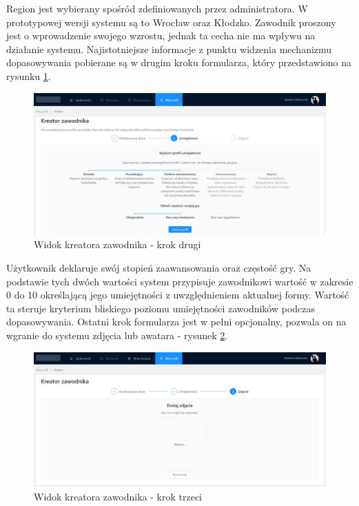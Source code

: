 Region jest wybierany spośród zdefiniowanych przez administratora. W prototypowej wersji systemu są to Wrocław oraz Kłodzko. Zawodnik proszony jest o wprowadzenie swojego wzrostu, jednak ta cecha nie ma wpływu na działanie systemu. Najistotniejsze informacje z punktu widzenia mechanizmu dopasowywania pobierane są w drugim kroku formularza, który przedstawiono na rysunku \ref{fig:ss-profile-2}.

\begin{figure}[H]
\centering
\includegraphics[width=\linewidth]{065-dzialanie/rys/ss-profile-2.PNG}
\caption{Widok kreatora zawodnika - krok drugi}
\label{fig:ss-profile-2}
\end{figure}

Użytkownik deklaruje swój stopień zaawansowania oraz częstość gry. Na podstawie tych dwóch wartości system przypisuje zawodnikowi wartość w zakresie 0 do 10 określającą jego umiejętności z uwzględnieniem aktualnej formy. Wartość ta steruje kryterium bliskiego poziomu umiejętności zawodników podczas dopasowywania. Ostatni krok formularza jest w pełni opcjonalny, pozwala on na wgranie do systemu zdjęcia lub awatara - rysunek \ref{fig:ss-profile-3}.

\begin{figure}[H]
\centering
\includegraphics[width=\linewidth]{065-dzialanie/rys/ss-profile-3.PNG}
\caption{Widok kreatora zawodnika - krok trzeci}
\label{fig:ss-profile-3}
\end{figure}

